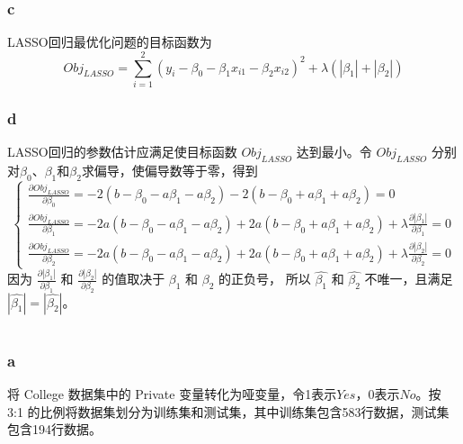 \documentclass[12pt,a4paper]{article}
\begin{document}
    \subsubsection*{c}
    LASSO回归最优化问题的目标函数为
    \begin{equation}
        Obj_{LASSO}=\sum_{i=1}^2\left(y_i-\beta_0-\beta_1x_{i1}-\beta_2x_{i2}\right)^2+\lambda\left(\left|\beta_1\right|+\left|\beta_2\right|\right)
    \end{equation}
    \subsubsection*{d}
    LASSO回归的参数估计应满足使目标函数 $Obj_{LASSO}$ 达到最小。令 $Obj_{LASSO}$ 分别对$\beta_0$、$\beta_1$和$\beta_2$求偏导，使偏导数等于零，得到
    \begin{equation}
        \begin{cases}
            \frac{\partial Obj_{LASSO}}{\partial\beta_0}=-2\left(b-\beta_0-a\beta_1-a\beta_2\right)-2\left(b-\beta_0+a\beta_1+a\beta_2\right)=0\\
            \frac{\partial Obj_{LASSO}}{\partial\beta_1}=-2a\left(b-\beta_0-a\beta_1-a\beta_2\right)+2a\left(b-\beta_0+a\beta_1+a\beta_2\right)+\lambda\frac{\partial\left|\beta_1\right|}{\partial\beta_1}=0\\
            \frac{\partial Obj_{LASSO}}{\partial\beta_2}=-2a\left(b-\beta_0-a\beta_1-a\beta_2\right)+2a\left(b-\beta_0+a\beta_1+a\beta_2\right)+\lambda\frac{\partial\left|\beta_2\right|}{\partial\beta_2}=0
        \end{cases}
    \end{equation}
    因为 $\frac{\partial\left|\beta_1\right|}{\partial\beta_1}$ 和 $\frac{\partial\left|\beta_2\right|}{\partial\beta_2}$ 的值取决于 $\beta_1$ 和 $\beta_2$ 的正负号，
    所以 $\hat{\beta_1}$ 和 $\hat{\beta_2}$ 不唯一，且满足 $\left|\hat{\beta_1}\right|=\left|\hat{\beta_2}\right|$。
    \section{}
    \vspace{10pt}
    \subsubsection*{a}
    将 College 数据集中的 Private 变量转化为哑变量，令1表示$Yes$，0表示$No$。按 3:1 的比例将数据集划分为训练集和测试集，其中训练集包含583行数据，测试集包含194行数据。
\end{document}
